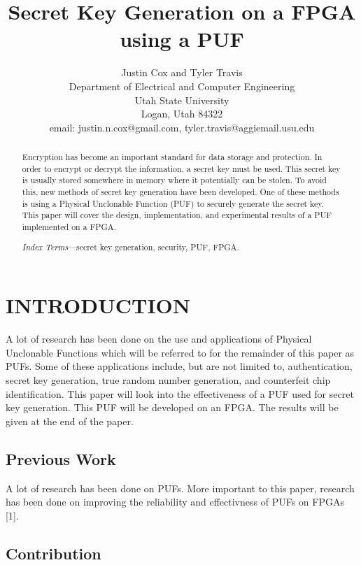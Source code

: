 \documentclass[letterpaper, 10 pt, conference]{ieeeconf}  %
\title{\LARGE \bf
Secret Key Generation on a FPGA using a PUF  
}
\author{Justin Cox and Tyler Travis
\\ \small{Department of Electrical and Computer Engineering}
\\ \small{Utah State University}
\\ \small{Logan, Utah 84322}
\\ \small{email: justin.n.cox@gmail.com, tyler.travis@aggiemail.usu.edu}
}
\begin{document}
\maketitle
\thispagestyle{empty}
\pagestyle{empty}


\begin{abstract}

Encryption has become an important standard for data storage and protection.  In order to encrypt or decrypt the information, a secret key must be used.  This secret key is usually stored somewhere in memory where it potentially can be stolen.  To avoid this, new methods of secret key generation have been developed.  One of these methods is using a Physical Unclonable Function (PUF) to securely generate the secret key.  This paper will cover the design, implementation, and experimental results of a PUF implemented on a FPGA.

\emph{Index Terms}---secret key generation, security, PUF, FPGA.

\end{abstract}

\section{INTRODUCTION}

A lot of research has been done on the use and applications of Physical Unclonable Functions which will be referred to for the remainder of this paper as PUFs.  Some of these applications include, but are not limited to, authentication, secret key generation, true random number generation, and counterfeit chip identification.  This paper will look into the effectiveness of a PUF used for secret key generation.  This PUF will be developed on an FPGA.  The results will be given at the end of the paper.   

\subsection{Previous Work}

A lot of research has been done on PUFs.  More important to this paper, research has been done on improving the reliability and effectivness of PUFs on FPGAs [1].

\subsection{Contribution}
\end{document}
